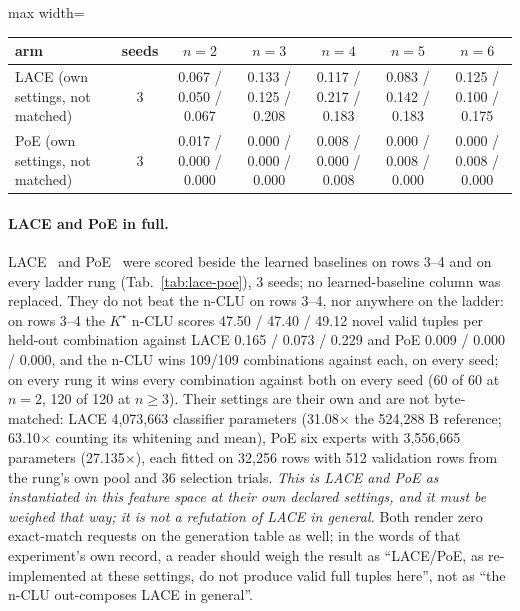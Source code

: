 \documentclass{article} %
\newcommand{\Kstar}{\ensuremath{K^{\star}}}
\begin{document}
\begin{table}[h]
\medskip
\begin{adjustbox}{max width=\linewidth}\begin{tabular}{lcccccc}
\toprule
arm & seeds & $n=2$ & $n=3$ & $n=4$ & $n=5$ & $n=6$ \\
\midrule
LACE (own settings, not matched) & 3 & 0.067 / 0.050 / 0.067 & 0.133 / 0.125 / 0.208 & 0.117 / 0.217 / 0.183 & 0.083 / 0.142 / 0.183 & 0.125 / 0.100 / 0.175 \\
PoE (own settings, not matched) & 3 & 0.017 / 0.000 / 0.000 & 0.000 / 0.000 / 0.000 & 0.008 / 0.000 / 0.008 & 0.000 / 0.008 / 0.000 & 0.000 / 0.008 / 0.000 \\
\bottomrule
\end{tabular}\end{adjustbox}
\end{table}

\paragraph{LACE and PoE in full.}
LACE~\citep{nie_controllable_2021} and PoE~\citep{hinton_training_2002} were scored beside the
learned baselines on rows 3--4 and on every ladder rung (Tab.~\ref{tab:lace-poe}), 3 seeds; no
learned-baseline column was replaced. They do not beat the
n-CLU on rows 3--4, nor anywhere on the ladder: on rows 3--4 the $\Kstar$ n-CLU scores 47.50 / %
47.40 / 49.12 novel valid tuples per held-out combination against LACE 0.165 / 0.073 / 0.229 and PoE 0.009 / %
0.000 / 0.000, and the n-CLU wins 109/109 combinations against each, on every seed; on every rung it %
wins every combination against both on every seed (60 of 60 at $n=2$, 120 of 120 at $n\ge3$). %
Their settings are their own and are not byte-matched: LACE 4,073,663 classifier parameters %
(31.08$\times$ the 524,288 B reference; 63.10$\times$ counting its whitening and mean), PoE six %
experts with 3,556,665 parameters (27.135$\times$), each fitted on 32,256 rows with 512 validation %
rows from the rung's own pool and 36 selection trials. %
\emph{This is LACE and PoE as instantiated in this feature space at their own declared settings,
and it must be weighed that way; it is not a refutation of LACE in general.} Both render zero
exact-match requests on the generation table as well; in the words of that experiment's own record, a
reader should weigh the result as ``LACE/PoE, as re-implemented at these settings, do not produce
valid full tuples here'', not as ``the n-CLU out-composes LACE in general''. %
\end{document}
